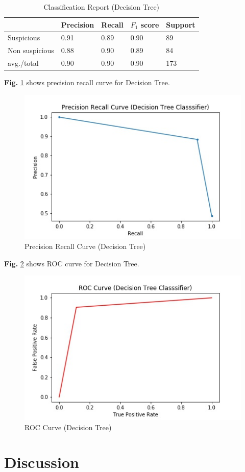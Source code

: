 \documentclass[12pt,a4paper]{report}
\begin{document}
\begin{table}[h!]
\begin{center}
\caption{Classification Report (Decision Tree)}
\begin{tabular}{|m{4.4cm} | m{2cm}| m{2cm}| m{2cm}| m{2cm}|}
\hline
     & Precision & Recall & $F_1$ score & Support \\
\hline
     Suspicious & 0.91 & 0.89 & 0.90 & 89\\
\hline 
     Non suspicious  & 0.88 & 0.90 & 0.89 & 84\\
\hline 
     avg./total & 0.90 & 0.90 & 0.90 & 173\\
\hline
\end{tabular}
\end{center}
\end{table}

\noindent
\textbf{Fig.} \ref{fig:prdct} shows precision recall curve for Decision Tree.

\begin{figure}[h!]
    \centering
    \includegraphics[scale=0.58]{Figures/PRDCT.jpg}
    \caption{Precision Recall Curve (Decision Tree)}
    \label{fig:prdct}
\end{figure}

\noindent
\textbf{Fig.} \ref{fig:rocdct} shows ROC curve for Decision Tree.

\begin{figure}[h!]
    \centering
    \includegraphics[scale=0.58]{Figures/ROCDCT.jpg}
    \caption{ROC Curve (Decision Tree)}
    \label{fig:rocdct}
\end{figure}

\section{Discussion}
\end{document}

